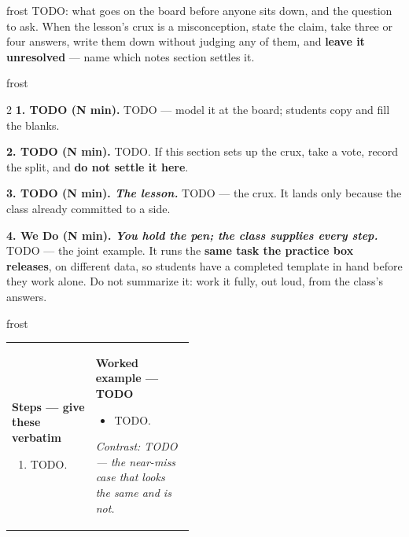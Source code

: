 \documentclass[10pt]{article}
\begin{document}
\boxguard
\begin{skillbox}[Hook]{frost}
    TODO: what goes on the board before anyone sits down, and the question to ask. When the
    lesson's crux is a misconception, state the claim, take three or four answers, write them
    down without judging any of them, and \textbf{leave it unresolved} --- name which notes
    section settles it.
\end{skillbox}

\boxguard
\begin{skillbox}{frost}
\begin{multicols}{2}
\textbf{1. TODO (N min).} TODO --- model it at the board; students copy and fill the blanks.

\textbf{2. TODO (N min).} TODO. If this section sets up the crux, take a vote, record the
split, and \textbf{do not settle it here}.

\textbf{3. TODO (N min). \emph{The lesson.}} TODO --- the crux. It lands only because the class
already committed to a side.

\textbf{4. We Do (N min). \emph{You hold the pen; the class supplies every step.}} TODO --- the
joint example. It runs the \textbf{same task the practice box releases}, on different data, so
students have a completed template in hand before they work alone. Do not summarize it: work it
fully, out loud, from the class's answers.
\end{multicols}
\end{skillbox}

\boxguard
\begin{skillbox}{frost}
\begin{tabularx}{\linewidth}{@{} p{0.46\linewidth} X @{}}
\begin{minipage}[t]{\linewidth}\vspace{0pt}
\textbf{Steps --- give these verbatim}
\begin{enumerate}[leftmargin=1.4em, itemsep=2pt, topsep=2pt]
  \item TODO.
\end{enumerate}
\end{minipage}
&
\begin{minipage}[t]{\linewidth}\vspace{0pt}
\textbf{Worked example --- TODO}
\begin{itemize}[leftmargin=1.1em, itemsep=2pt, topsep=2pt]
  \item[1.] TODO.
\end{itemize}
\textit{Contrast: TODO --- the near-miss case that looks the same and is not.}
\end{minipage}
\end{tabularx}
\end{skillbox}
\end{document}
